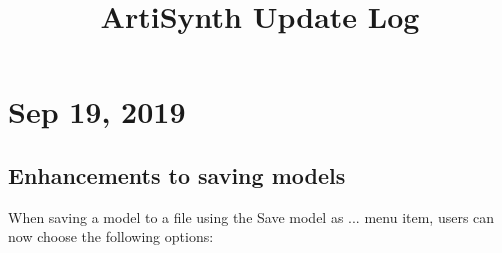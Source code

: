 \documentclass{article}
\title{ArtiSynth Update Log}
\date{}
\begin{document}
\iflatexml
\else
\maketitle
\fi

%
%
%



\section*{Sep 19, 2019}

\subsection*{Enhancements to saving models}

When saving a model to a file using the {\sf Save model as ...} menu
item, users can now choose the following options:
\end{document}
